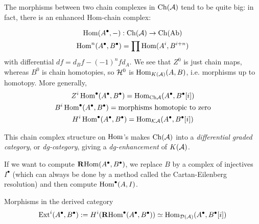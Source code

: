 The morphisms between two chain complexes in $\mathrm{Ch}(\mathcal{A})$ tend to be quite big: in fact, there is an enhanced Hom-chain complex:

\begin{gather*}
    \operatorname{Hom}(A^\bullet, -):\mathrm{Ch}(\mathcal{A})\rightarrow \mathrm{Ch}(\mathrm{Ab})\\
    \operatorname{Hom}^n(A^\bullet,B^\bullet) = \prod\operatorname{Hom}(A^i, B^{i+n})
\end{gather*}
with differential $df=d_Bf-(-1)^nfd_A$. We see that $Z^0$ is just chain maps, whereas $B^0$ is chain homotopies, so $\mathcal{H}^0$ is $\operatorname{Hom}_{K(\mathcal{A})}(A,B)$, i.e. morphisms up to homotopy. More generally,
$$\begin{gathered}
    Z^i \operatorname{Hom}^\bullet(A^\bullet, B^\bullet)= \operatorname{Hom}_{\mathrm{Ch} \mathcal{A}}(A^\bullet, B^\bullet[i])\\
    B^i \operatorname{Hom}^\bullet(A^\bullet, B^\bullet) = \text{morphisms homotopic to zero}\\
    H^i \operatorname{Hom}^\bullet(A^\bullet, B^\bullet)=\operatorname{Hom}_{\mathcal{K} \mathcal{A}}(A^\bullet, B^\bullet[i])
\end{gathered}$$

\begin{remark}{}{}
    This chain complex structure on $\operatorname{Hom}$'s makes $\operatorname{Ch}(\mathcal{A})$ into a
    \emph{differential graded category}, or \emph{dg-category}, giving a
    \emph{dg-enhancement} of $K(\mathcal{A})$.
\end{remark}

If we want to compute $\operatorname{\mathbf{R} Hom}(A^\bullet,B^\bullet)$, we replace $B$ by a complex of injectives $I^\bullet$ (which can always be done by a method called the Cartan-Eilenberg resolution) and then compute $\operatorname{Hom}^\bullet(A,I)$.

\begin{proposition}{Morphisms in the derived category}{}
    $$\operatorname{Ext}^i(A^\bullet, B^\bullet):=H^i(\operatorname{\mathbf{R} Hom}^\bullet(A^\bullet,B^\bullet))\simeq \operatorname{Hom}_{\mathcal{D}(\mathcal{A})}(A^\bullet, B^\bullet[i])$$
\end{proposition}

